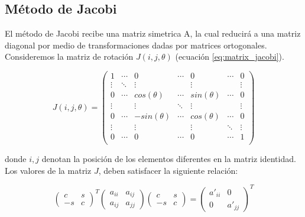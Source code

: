 \subsection{Método de Jacobi}

El método de Jacobi recibe una matriz simetrica A, la cual reducirá a una matriz diagonal por medio de transformaciones dadas por matrices ortogonales. Consideremos la matriz de rotación $J(i,j,\theta)$ (ecuación \ref{eq:matrix_jacobi}).

\begin{equation}
    J(i,j,\theta)=\begin{pmatrix}
        1      & \cdots & 0            & \cdots & 0           & \cdots & 0      \\
        \vdots & \ddots & \vdots       &        & \vdots      &        & \vdots \\
        0      & \cdots & cos(\theta)  & \cdots & sin(\theta) & \cdots & 0      \\
        \vdots &        & \vdots       & \ddots & \vdots      &        & \vdots \\
        0      & \cdots & -sin(\theta) & \cdots & cos(\theta) & \cdots & 0      \\
        \vdots &        & \vdots       &        & \vdots      & \ddots & \vdots \\
        0      & \cdots & 0            & \cdots & 0           & \cdots & 1      \\
    \end{pmatrix}
    \label{eq:matrix_jacobi}
\end{equation}

donde $i,j$ denotan la posición de los elementos diferentes en la matriz identidad. Los valores de la matriz $J$, deben satisfacer la siguiente relación:

\begin{equation*}
    \begin{pmatrix}
        c  & s \\
        -s & c
    \end{pmatrix}^T
    \begin{pmatrix}
        a_{ii} & a_{ij} \\
        a_{ij} & a_{jj}
    \end{pmatrix}
    \begin{pmatrix}
        c  & s \\
        -s & c
    \end{pmatrix} =
    \begin{pmatrix}
        a'_{ii} & 0       \\
        0       & a'_{jj}
    \end{pmatrix}^T
\end{equation*}

